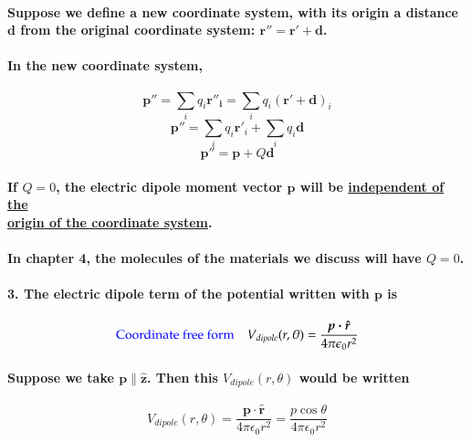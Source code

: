 \documentclass{article}
\begin{document}
\paragraph{\indent Suppose we define a new coordinate system, with its origin a distance $\boldsymbol{d}$ from the original coordinate system: $\boldsymbol{r''=r'+d}$.}
\paragraph{\indent In the new coordinate system, }
\begin{equation*}
    \boldsymbol{p''}=\sum_{i}q_i\boldsymbol{r''_i}=\sum_{i}q_i(\boldsymbol{r'+d})_i
\end{equation*}
\begin{equation*}
    \boldsymbol{p''}=\sum_{i}q_i\boldsymbol{r'}_i+\sum_{i}q_i\boldsymbol{d}
\end{equation*}
\begin{equation*}
    \boldsymbol{p''}=\boldsymbol{p}+Q\boldsymbol{d}
\end{equation*}
\paragraph{If $Q=0$, the electric dipole moment vector $\boldsymbol{p}$ will be \underline{independent of the}\\ 
\underline{origin of the coordinate system}.}
\paragraph{In chapter 4, the molecules of the materials we discuss will have $Q=0$.}
\paragraph{3. The electric dipole term of the potential written with $\boldsymbol{p}$ is}
\begin{equation*}
    \text{\textcolor{blue}{Coordinate free form}} \quad V_{dipole}(r,\theta)= \frac{\boldsymbol{p\cdot \hat{r}}}{4\pi\epsilon_0 r^2}
\end{equation*}
\paragraph{\indent Suppose we take $\boldsymbol{p} \parallel \hat{\boldsymbol{z}}$. Then this $V_{dipole}(r,\theta)$ would be written}
\begin{equation*}
    V_{dipole}(r,\theta)=\frac{\boldsymbol{p}\cdot\hat{\boldsymbol{r}}}{4\pi\epsilon_0r^2}=\frac{p\cos\theta}{4\pi\epsilon_0r^2}
\end{equation*}
\end{document}
